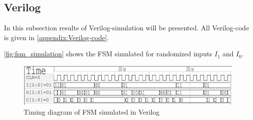 \begin{table}[H]
\centering
\caption{Leakage Current}
\label{tab:leakage}
\end{table}

\begin{table}[H]
\centering
\caption{Static Power Consumption}
\label{tab:power}
\end{table}

\subsection{Verilog}

In this subsection results of Verilog-simulation will be presented. All Verilog-code is given in \autoref{appendix:Verilog-code}.

\autoref{fig:fsm_simulation} shows the FSM simulated for randomized inputs $I_1$ and $I_0$.

\begin{figure}[H]
    \centering
    \includegraphics[width=\textwidth]{Figures/FSM_testbench_out.png}
    \caption{Timing diagram of FSM simulated in Verilog}
    \label{fig:fsm_simulation}
\end{figure}

